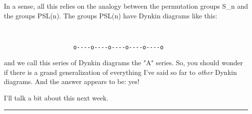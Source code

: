 In a sense, all this relies on the analogy between the permutation
groups S_{n} and the groups PSL(n).   The groups PSL(n) have Dynkin
diagrams like this: 

               

\begin{verbatim}


                    o----o----o----o----o----o

\end{verbatim}
    
and we call this series of Dynkin diagrams the "A" series.  So, you
should wonder if there is a grand generalization of everything I've
said so far to \emph{other} Dynkin diagrams.  And the answer appears to be:
yes!  

I'll talk a bit about this next week.

\par\noindent\rule{\textwidth}{0.4pt}
